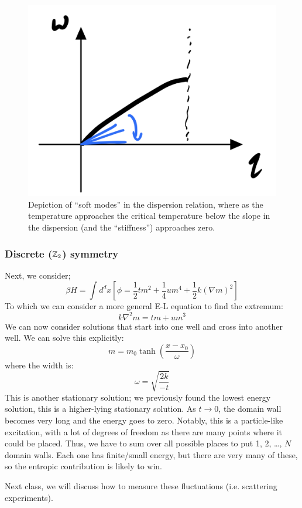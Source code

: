 \begin{figure}[htbp]
    \centering
    \includegraphics[scale=0.4]{Lectures/Figures/soft_modes.png}
    \caption{Depiction of ``soft modes'' in the dispersion relation, where as the temperature approaches the critical temperature below the slope in the dispersion (and the ``stiffness'') approaches zero.}
    \label{fig:soft_modes}
\end{figure}

\subsubsection*{Discrete ($\mathbb{Z}_2$) symmetry}
Next, we consider;
\begin{equation}
    \beta H = \int d^dx[\phi = \frac{1}{2}tm^2 + \frac{1}{4}um^4 + \frac{1}{2}k(\nabla m)^2]
\end{equation}
To which we can consider a more general E-L equation to find the extremum:
\begin{equation}
    k\nabla^2 m = tm + um^3
\end{equation}
We can now consider solutions that start into one well and cross into another well. We can solve this explicitly:
\begin{equation}
    m = m_0\tanh(\frac{x-x_0}{\omega})
\end{equation}
where the width is:
\begin{equation}
    \omega = \sqrt{\frac{2k}{-t}}
\end{equation}
This is another stationary solution; we previously found the lowest energy solution, this is a higher-lying stationary solution. As $t \to 0$, the domain wall becomes very long and the energy goes to zero. Notably, this is a particle-like excitation, with a lot of degrees of freedom as there are many points where it could be placed. Thus, we have to sum over all possible places to put 1, 2, \dots, $N$ domain walls. Each one has finite/small energy, but there are very many of these, so the entropic contribution is likely to win.

Next class, we will discuss how to measure these fluctuations (i.e. scattering experiments).
